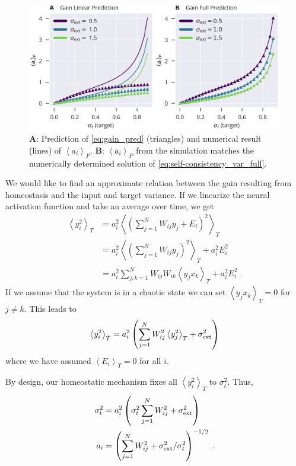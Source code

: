 \documentclass[10pt,a4paper]{article}
\newcommand{\avgt}[1]{\left< #1 \right>_T}
\newcommand{\avgp}[1]{\left< #1 \right>_P}
\begin{document}
\begin{figure}[t]
	\centering
	\includegraphics[width=\textwidth]{../plots/std_in_std_target_sweep_fig_cut.png}
	\caption{{\bf A}: Prediction of \eqref{eq:gain_pred} (triangles) and numerical result (lines) of $\avgp{a_i}$. {\bf B}: $\avgp{a_i}$ from the simulation matches the numerically determined solution of \eqref{eq:self-consistency_var_full}.}
\end{figure}

We would like to find an approximate relation between the gain resulting from homeostasis and the input and target variance. If we linearize the neural activation function and take an average over time, we get
\begin{align}
	\avgt{y_i^2} &= a_i^2 \avgt{\left(\sum_{j=1}^{N} W_{ij} y_j + E_i\right)^2} \label{eq:time_avg_act_var}\\
	&= a_i^2 \avgt{\left( \sum_{j=1}^{N} W_{ij} y_j \right)^2} + a_i^2 E_i^2 \\
	&= a_i^2 \sum_{j,k=1}^{N} W_{ij}W_{ik} \avgt{y_j x_k} + a_i^2 E_i^2 \; .
\end{align}
If we assume that the system is in a chaotic state we can set $\avgt{y_j x_k}=0$ for $j\neq k$. This leads to
\begin{equation}
	\avgt{y_i^2} = a_i^2 \left( \sum_{j=1}^{N} W_{ij}^2 \avgt{y_j^2} + \sigma_{\rm ext}^2 \right)
\end{equation}
where we have assumed $\avgt{E_i} = 0$ for all $i$.

By design, our homeostatic mechanism fixes all $\avgt{y_i^2}$ to $\sigma_{t}^2$. Thus,
\begin{align}
	\sigma_{t}^2 &= a_i^2 \left( \sigma_{t}^2 \sum_{j=1}^{N} W_{ij}^2 + \sigma_{\rm ext}^2 \right) \\ 
	a_i &= \left(\sum_{j=1}^{N} W_{ij}^2 + \sigma_{\rm ext}^2 / \sigma_{t}^2\right)^{-1/2} \; .
\end{align}
\end{document}
